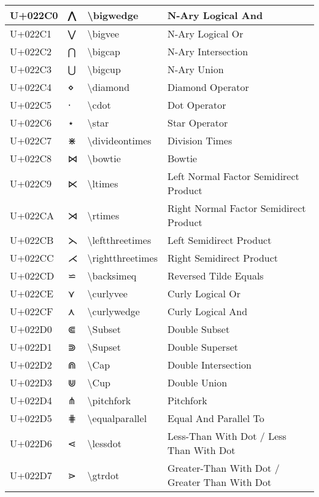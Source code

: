\begin{table}[h]
\begin{tabulary}{\linewidth}{|L|L|L|L|}
U+022C0 & ⋀ & {\textbackslash}bigwedge & N-Ary Logical And \\
\hline
U+022C1 & ⋁ & {\textbackslash}bigvee & N-Ary Logical Or \\
\hline
U+022C2 & ⋂ & {\textbackslash}bigcap & N-Ary Intersection \\
\hline
U+022C3 & ⋃ & {\textbackslash}bigcup & N-Ary Union \\
\hline
U+022C4 & ⋄ & {\textbackslash}diamond & Diamond Operator \\
\hline
U+022C5 & ⋅ & {\textbackslash}cdot & Dot Operator \\
\hline
U+022C6 & ⋆ & {\textbackslash}star & Star Operator \\
\hline
U+022C7 & ⋇ & {\textbackslash}divideontimes & Division Times \\
\hline
U+022C8 & ⋈ & {\textbackslash}bowtie & Bowtie \\
\hline
U+022C9 & ⋉ & {\textbackslash}ltimes & Left Normal Factor Semidirect Product \\
\hline
U+022CA & ⋊ & {\textbackslash}rtimes & Right Normal Factor Semidirect Product \\
\hline
U+022CB & ⋋ & {\textbackslash}leftthreetimes & Left Semidirect Product \\
\hline
U+022CC & ⋌ & {\textbackslash}rightthreetimes & Right Semidirect Product \\
\hline
U+022CD & ⋍ & {\textbackslash}backsimeq & Reversed Tilde Equals \\
\hline
U+022CE & ⋎ & {\textbackslash}curlyvee & Curly Logical Or \\
\hline
U+022CF & ⋏ & {\textbackslash}curlywedge & Curly Logical And \\
\hline
U+022D0 & ⋐ & {\textbackslash}Subset & Double Subset \\
\hline
U+022D1 & ⋑ & {\textbackslash}Supset & Double Superset \\
\hline
U+022D2 & ⋒ & {\textbackslash}Cap & Double Intersection \\
\hline
U+022D3 & ⋓ & {\textbackslash}Cup & Double Union \\
\hline
U+022D4 & ⋔ & {\textbackslash}pitchfork & Pitchfork \\
\hline
U+022D5 & ⋕ & {\textbackslash}equalparallel & Equal And Parallel To \\
\hline
U+022D6 & ⋖ & {\textbackslash}lessdot & Less-Than With Dot / Less Than With Dot \\
\hline
U+022D7 & ⋗ & {\textbackslash}gtrdot & Greater-Than With Dot / Greater Than With Dot \\

\end{tabulary}
\end{table}
